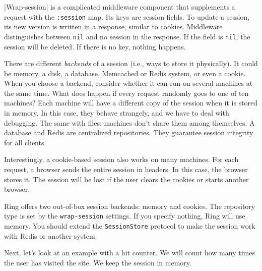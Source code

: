 
|Wrap-session| is a complicated middleware component that supplements a request with the \verb|:session| map. Its keys are session fields. To update a session, its new version is written in a response, similar to cookies. Middleware distinguishes between \verb|nil| and no session in the response. If the field is \verb|nil|, the session will be deleted. If there is no key, nothing happens.


There are different \emph{backends} of a session (i.e., ways to store it physically). It could be memory, a disk, a database, Memcached or Redis system, or even a cookie. When you choose a backend, consider whether it can run on several machines at the same time. What does happen if every request randomly goes to one of ten machines? Each machine will have a different copy of the session when it is stored in memory. In this case, they behave strangely, and we have to deal with debugging. The same with files: machines don't share them among themselves. A database and Redis are centralized repositories. They guarantee session integrity for all clients.

Interestingly, a cookie-based session also works on many machines. For each request, a browser sends the entire session in headers. In this case, the browser stores it. The session will be lost if the user clears the cookies or starts another browser.

Ring offers two out-of-box session backends: memory and cookies. The repository type is set by the \verb|wrap-session| settings. If you specify nothing, Ring will use memory. You should extend the \verb|SessionStore| protocol to make the session work with Redis or another system.

Next, let's look at an example with a hit counter. We will count how many times the user has visited the site. We keep the session in memory.


\begin{english}
\end{english}

